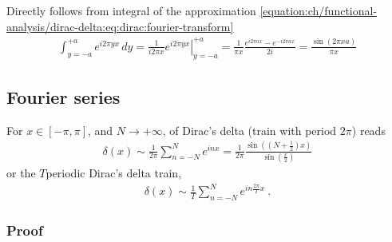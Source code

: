\documentclass[letterpaper,10pt,english]{jupyterBook}
\begin{document}
\sphinxAtStartPar
Directly follows from integral of the approximation \eqref{equation:ch/functional-analysis/dirac-delta:eq:dirac:fourier-transform}
\begin{equation*}
\begin{split}\int_{y=-a}^{+a} e^{i 2 \pi y x} \, dy = \frac{1}{i 2 \pi x} \left. e^{i 2 \pi y x}\right|_{y=-a}^{+a} = \frac{1}{\pi x} \frac{e^{i 2 \pi a x} - e^{-i 2 \pi a x}}{2 i} = \frac{\sin(2 \pi x a)}{\pi x}\end{split}
\end{equation*}

\subsection{Fourier series}
\label{\detokenize{ch/functional-analysis/dirac-delta:fourier-series}}\label{\detokenize{ch/functional-analysis/dirac-delta:functional-analysis-dirac-delta-approximations-fourier-series}}
\sphinxAtStartPar
For \(x \in [-\pi, \pi]\), and \(N \rightarrow +\infty\), {\hyperref[\detokenize{ch/complex/fourier-transforms:complex-fourier-series}]{}} of Dirac’s delta (train with period \(2\pi\)) reads
\begin{equation*}
\begin{split}\delta(x) \sim \frac{1}{2\pi}\sum_{n=-N}^{N} e^{i n x} = \frac{1}{2 \pi} \frac{\sin\left(\left(N+\frac{1}{2}\right)x\right)}{\sin\left( \frac{x}{2} \right)}\end{split}
\end{equation*}
\sphinxAtStartPar
or the \(T\)\sphinxhyphen{}periodic Dirac’s delta train,
\begin{equation*}
\begin{split}\delta(x) \sim \frac{1}{T}\sum_{n=-N}^{N} e^{i n \frac{2\pi}{T} x} \ .\end{split}
\end{equation*}
\sphinxAtStartPar
{} 
\subsubsection*{Proof}
\end{document}
